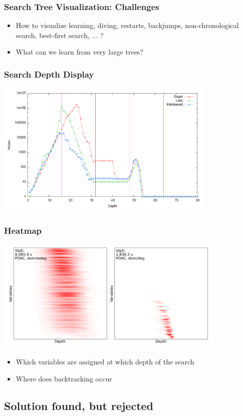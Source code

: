 \begin{frame}
  \frametitle{Search Tree Visualization: Challenges}
    \begin{itemize}
    \item How to visualize learning, diving, restarts, backjumps, non-chronological search, best-first search, ... ?
    \item What can we learn from very large trees?
    \end{itemize}
\end{frame}

\begin{frame}
  \frametitle{Search Depth Display \cite{DBLP:conf/cpaior/SimonisO11}}
  \includegraphics[width=10.5cm]{images/searchdepth}
\end{frame}

\begin{frame}
  \frametitle{Heatmap \cite{DBLP:conf/cp/HowellCY20}}
  \includegraphics[width=11cm]{images/heatmaphowell}
  \begin{itemize}
      \item Which variables are assigned at which depth of the search
      \item Where does backtracking occur
  \end{itemize}
\end{frame}

\subsection*{Solution found, but rejected}

